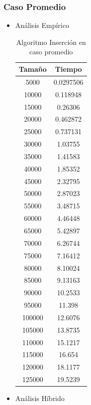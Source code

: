 \documentclass[a4paper,12pt,twoside]{article} %
\begin{document}
	\subsubsection{Caso Promedio}
\begin{itemize}
		
		\item Análisis Empírico
		
\begin{table}[h]
	\begin{center}
		\begin{tabular}{|c|c|}
		\hline
		Tamaño & Tiempo \\
		\hline
		5000 & 0.0297506 \\
		10000 & 0.118948 \\
		15000 & 0.26306 \\
		20000 & 0.462872 \\
		25000 & 0.737131 \\
		30000 & 1.03755 \\
		35000 & 1.41583 \\
		40000 & 1.85352 \\
		45000 & 2.32795 \\
		50000 & 2.87023 \\
		55000 & 3.48715 \\
		60000 & 4.46448 \\
		65000 & 5.42897 \\
		70000 & 6.26744 \\
		75000 & 7.16412 \\
		80000 & 8.10024 \\
		85000 & 9.13163 \\
		90000 & 10.2533 \\
		95000 & 11.398 \\
		100000 & 12.6076 \\
		105000 & 13.8735 \\
		110000 & 15.1217 \\
		115000 & 16.654 \\
		120000 & 18.1177 \\
		125000 & 19.5239 \\
		\hline
		\end{tabular}
	\end{center}
	\caption{Algoritmo Inserción en caso promedio}
\end{table}
\newpage

		\item Análisis Híbrido
		
\begin{figure}[h]
  \begin{center}
  

\end{center}
\end{figure}
\end{itemize}
\end{document}
